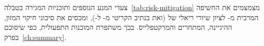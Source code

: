 \begin{keymessage}
צעדי המנע הנוספים ותוכניות המגירה בטבלה~\ref{tab:risk-mitigation} מצמצמים את
החשיפה המרבית מ- לציון שיורי ריאלי של  (ואת  בנתיב
הקריטי מ- ל-), ומכסים את סיכוני חיקוי המזון, ההיגיינה, המתחרים
והמרקטפלייס. בכך משתפרת המוכנות התפעולית, כפי שיסוכם בפרק~\ref{ch:summary}.
\end{keymessage}
